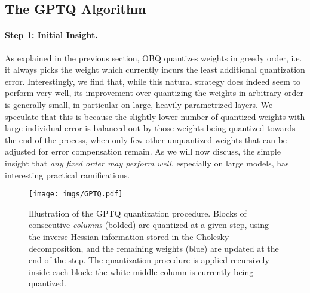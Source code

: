 \subsection{The GPTQ Algorithm}
\label{sec:gptq}

\paragraph{Step 1: Initial Insight.} As explained in the previous section, OBQ quantizes weights in greedy order, i.e. it always picks the weight which currently incurs the least additional quantization error. Interestingly, we find that, while this natural strategy does indeed seem to perform very well, its improvement over quantizing the weights in arbitrary order is generally small, in particular on large, heavily-parametrized layers. 
We speculate that this is because the slightly lower number of quantized weights with large individual error is balanced out by those weights being quantized towards the end of the process, when only few other unquantized weights that can be adjusted for error compensation remain. As we will now discuss, the simple insight that \emph{any fixed order may perform well}, especially on large models, has interesting practical ramifications.

\begin{wrapfigure}{r}{0.49\textwidth}
    \vspace{-10pt}
  \begin{center}
    \texttt{[image: imgs/GPTQ.pdf]}
  \end{center}
      \caption{ Illustration of the GPTQ quantization procedure. Blocks of consecutive \emph{columns} (bolded) are quantized at a given step, using the inverse Hessian information stored in the Cholesky decomposition, and the remaining weights (blue) are updated at the end of the step. The quantization procedure is applied recursively inside each block: the white middle column is currently being quantized.}
    \vspace{-10pt}
\label{fig:illustration}
\end{wrapfigure}

